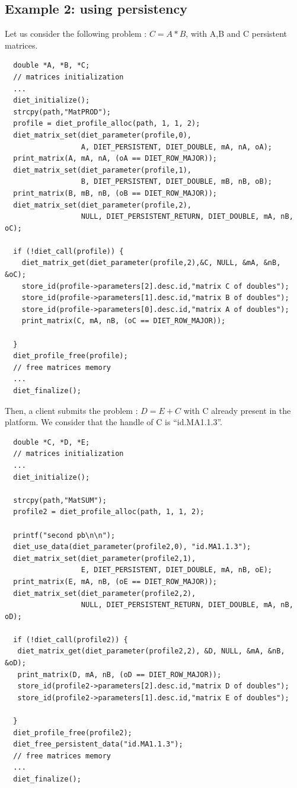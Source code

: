 \subsection{Example 2: using persistency}

Let us consider the following problem : $C=A*B$, with A,B and C
persistent matrices.


{\footnotesize
\begin{verbatim}
  double *A, *B, *C; 
  // matrices initialization
  ...
  diet_initialize();
  strcpy(path,"MatPROD");
  profile = diet_profile_alloc(path, 1, 1, 2);
  diet_matrix_set(diet_parameter(profile,0),
                  A, DIET_PERSISTENT, DIET_DOUBLE, mA, nA, oA);
  print_matrix(A, mA, nA, (oA == DIET_ROW_MAJOR));
  diet_matrix_set(diet_parameter(profile,1),
                  B, DIET_PERSISTENT, DIET_DOUBLE, mB, nB, oB);
  print_matrix(B, mB, nB, (oB == DIET_ROW_MAJOR));
  diet_matrix_set(diet_parameter(profile,2),
                  NULL, DIET_PERSISTENT_RETURN, DIET_DOUBLE, mA, nB, oC);
  
  if (!diet_call(profile)) {
    diet_matrix_get(diet_parameter(profile,2),&C, NULL, &mA, &nB, &oC);
    store_id(profile->parameters[2].desc.id,"matrix C of doubles");
    store_id(profile->parameters[1].desc.id,"matrix B of doubles");
    store_id(profile->parameters[0].desc.id,"matrix A of doubles");
    print_matrix(C, mA, nB, (oC == DIET_ROW_MAJOR));
      
  }
  diet_profile_free(profile);
  // free matrices memory
  ...
  diet_finalize();
\end{verbatim}
}

Then, a client submits the problem : $D=E+C$ with C already present
in the platform. We consider that the handle of C is ``id.MA1.1.3''.

{\footnotesize
\begin{verbatim}
  double *C, *D, *E; 
  // matrices initialization
  ...
  diet_initialize();

  strcpy(path,"MatSUM");
  profile2 = diet_profile_alloc(path, 1, 1, 2);
  
  printf("second pb\n\n");
  diet_use_data(diet_parameter(profile2,0), "id.MA1.1.3");
  diet_matrix_set(diet_parameter(profile2,1),
                  E, DIET_PERSISTENT, DIET_DOUBLE, mA, nB, oE);
  print_matrix(E, mA, nB, (oE == DIET_ROW_MAJOR));
  diet_matrix_set(diet_parameter(profile2,2),
                  NULL, DIET_PERSISTENT_RETURN, DIET_DOUBLE, mA, nB, oD);
  
  if (!diet_call(profile2)) {
   diet_matrix_get(diet_parameter(profile2,2), &D, NULL, &mA, &nB, &oD);
   print_matrix(D, mA, nB, (oD == DIET_ROW_MAJOR));
   store_id(profile2->parameters[2].desc.id,"matrix D of doubles");
   store_id(profile2->parameters[1].desc.id,"matrix E of doubles");
  
  }
  diet_profile_free(profile2);
  diet_free_persistent_data("id.MA1.1.3");
  // free matrices memory
  ...
  diet_finalize();
\end{verbatim}
}  

